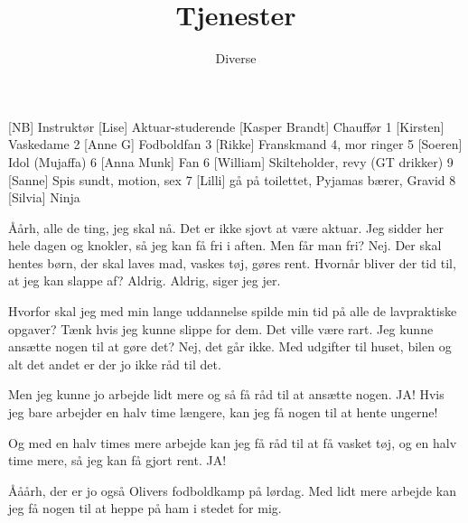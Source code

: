 \documentclass[a4paper,11pt]{article}
\title{Tjenester}
\author{Diverse}
\begin{document}
\maketitle
\begin{roles}
[NB] Instruktør
[Lise] Aktuar-studerende
[Kasper Brandt] Chauffør 1
[Kirsten] Vaskedame 2
[Anne G] Fodboldfan 3
[Rikke] Franskmand 4, mor ringer 5
[Soeren] Idol (Mujaffa) 6
[Anna Munk] Fan 6
[William] Skilteholder, revy (GT drikker) 9
[Sanne] Spis sundt, motion, sex 7
[Lilli] gå på toilettet, Pyjamas bærer, Gravid 8
[Silvia] Ninja
\end{roles}

\begin{sketch}


 Åårh, alle de ting, jeg skal nå. Det er ikke sjovt at være aktuar. Jeg sidder her hele dagen og knokler, så jeg kan få fri i aften. Men får man fri? Nej. Der skal hentes børn, der skal laves mad, vaskes tøj, gøres rent. Hvornår bliver der tid til, at jeg kan slappe af? Aldrig. Aldrig, siger jeg jer.

 Hvorfor skal jeg med min lange uddannelse spilde min tid på alle de lavpraktiske opgaver? Tænk hvis jeg kunne slippe for dem. Det ville være rart. Jeg kunne ansætte nogen til at gøre det? Nej, det går ikke. Med udgifter til huset, bilen og alt det andet er der jo ikke råd til det.

 Men jeg kunne jo arbejde lidt mere og så få råd til at ansætte nogen. JA! Hvis jeg bare arbejder en halv time længere, kan jeg få nogen til at hente ungerne!


 Og med en halv times mere arbejde kan jeg få råd til at få vasket tøj, og en halv time mere, så jeg kan få gjort rent. JA!


 Ååårh, der er jo også Olivers fodboldkamp på lørdag. Med lidt mere arbejde kan jeg få nogen til at heppe på ham i stedet for mig.


\end{sketch}
\end{document}
